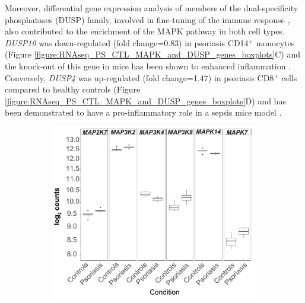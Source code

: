 Moreover, differential gene expression analysis of members of the dual-specificity phosphatases (DUSP) family, involved in fine-tuning of the immune response \parencite{Qian2009}, also contributed to the enrichment of the MAPK pathway in both cell types. \textit{DUSP10} was down-regulated (fold change=0.83) in psoriasis CD14$^+$ monocytes (Figure \ref{figure:RNAseq_PS_CTL_MAPK_and_DUSP_genes_boxplots}C) and the knock-out of this gene in mice has been shown to enhanced inflammation \parencite{Qian2009}. Conversely, \textit{DUSP4} was up-regulated (fold change=1.47) in psoriasis CD8$^+$ cells compared to healthy controls (Figure \ref{figure:RNAseq_PS_CTL_MAPK_and_DUSP_genes_boxplots}D) and has been demonstrated to have a pro-inflammatory role in a sepsis mice model \parencite{Cornell2010}.


\begin{figure}[htbp]
\centering
\begin{subfigure}{0.5\textwidth}
\centering
\includegraphics[width=\textwidth]{./Results2/pdfs/RNAseq_PS_CTL_CD14_MAPK_boxplots}
\caption{\textbf{}}
\end{subfigure}
\begin{subfigure}{0.5\textwidth}
\centering

\end{subfigure}
\end{figure}
